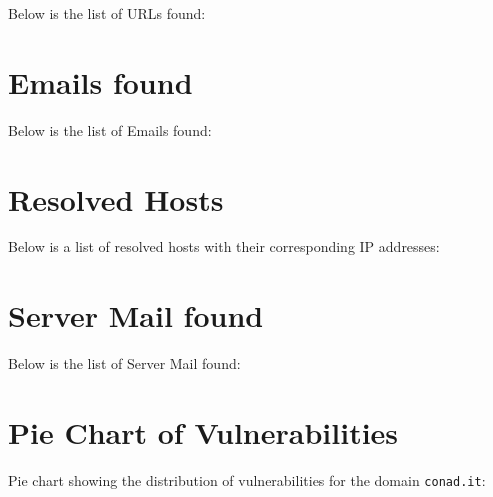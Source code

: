 \documentclass{article}
\begin{document}
Below is the list of URLs found:



\section*{Emails found}

Below is the list of Emails found:


\section*{Resolved Hosts}

Below is a list of resolved hosts with their corresponding IP addresses:


\section*{Server Mail found}

Below is the list of Server Mail found:


\section*{Pie Chart of Vulnerabilities}

\noindent Pie chart showing the distribution of vulnerabilities for the domain \texttt{conad.it}:
\end{document}
